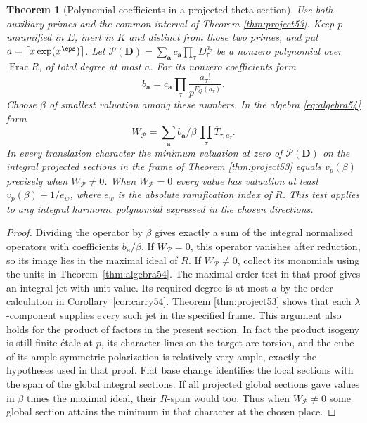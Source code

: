\documentclass[a4paper,11pt]{article}
\newtheorem{theorem}[proposition]{Theorem}
\theoremstyle{definition}
\theoremstyle{remark}
\numberwithin{equation}{section}
\begin{document}
\begin{theorem}[Polynomial coefficients in a projected theta section]\label{thm:poly54}
Use both auxiliary primes and the common interval of
Theorem \ref{thm:project53}.
Keep \(p\) unramified in \(E\), inert in \(K\) and distinct
from those two primes, and put \(a=\lceil x\exp(x^\eps)\rceil\). Let
\(\mathcal P(\boldsymbol D)=\sum_{\boldsymbol a}c_{\boldsymbol a}
\prod_\tau D_\tau^{a_\tau}\) be a nonzero polynomial over
\(\operatorname{Frac}R\), of total degree at most \(a\).
For its nonzero coefficients form
\[
       b_{\boldsymbol a}
         =c_{\boldsymbol a}\prod_\tau
                     \frac{a_\tau!}{p^{F_Q(a_\tau)}} .
\]
Choose \(\beta\) of smallest valuation among these numbers. In the
algebra \eqref{eq:algebra54} form
\[
      W_{\mathcal P}
       =\sum_{\boldsymbol a}
          \overline{b_{\boldsymbol a}/\beta}\,
                          \prod_\tau\overline T_{\tau,a_\tau}.
\]
In every translation character the minimum valuation at zero of
\(\mathcal P(\boldsymbol D)\) on the integral projected sections in
the frame of Theorem \ref{thm:project53} equals \(v_p(\beta)\) precisely when
\(W_{\mathcal P}\ne0\). When \(W_{\mathcal P}=0\) every value has
valuation at least \(v_p(\beta)+1/e_w\), where \(e_w\) is the absolute
ramification index of \(R\). This test applies to any integral
harmonic polynomial expressed in the chosen directions.
\end{theorem}
\begin{proof}
Dividing the operator by \(\beta\) gives exactly a sum of the integral
normalized operators with coefficients \(b_{\boldsymbol a}/\beta\).
If \(W_{\mathcal P}=0\), this operator vanishes after reduction, so
its image lies in the maximal ideal of \(R\). If \(W_{\mathcal P}\ne0\),
collect its monomials using the units in Theorem~\ref{thm:algebra54}.
The maximal-order test in that proof gives an integral jet with
unit value. Its required degree is at most \(a\) by the order
calculation in Corollary~\ref{cor:carry54}. Theorem \ref{thm:project53}
shows that each \(\lambda\)-component supplies every such jet in
the specified frame. This argument also holds for the product of
factors in the present section. In fact the product isogeny is
still finite \'etale at \(p\), its character lines on the target
are torsion, and the cube of its ample symmetric polarization is
relatively very ample, exactly the hypotheses used in that proof.
Flat base change identifies the local sections with the span
of the global integral sections. If all projected global sections
gave values in \(\beta\) times the maximal ideal, their \(R\)-span
would too. Thus when \(W_{\mathcal P}\ne0\) some global section
attains the minimum in that character at the chosen place.
\end{proof}
\end{document}
